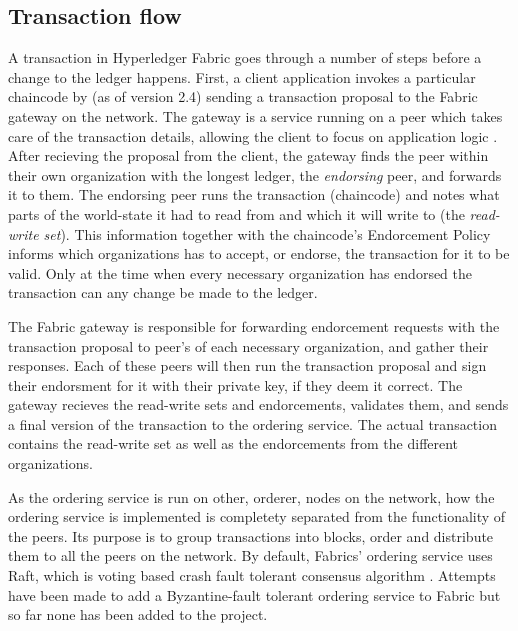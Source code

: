 \documentclass[english, biblatex, digitaloutput]{kththesis}
\begin{document}


\subsection{Transaction flow}
\label{subsec:transaction-flow}

A transaction in Hyperledger Fabric goes through a number of steps before a change to the ledger happens. First, a client application invokes a particular chaincode by (as of version 2.4) sending a transaction proposal to the Fabric gateway on the network. The gateway is a service running on a peer which takes care of the transaction details, allowing the client to focus on application logic \cite{fabric_gateway_2022}. After recieving the proposal from the client, the gateway finds the peer within their own organization with the longest ledger, the \textit{endorsing} peer, and forwards it to them. The endorsing peer runs the transaction (\ie chaincode) and notes what parts of the world-state it had to read from and which it will write to (the \textit{read-write set}). This information together with the chaincode's Endorcement Policy informs which organizations has to accept, or endorse, the transaction for it to be valid. Only at the time when every necessary organization has endorsed the transaction can any change be made to the ledger.

The Fabric gateway is responsible for forwarding endorcement requests with the transaction proposal to peer's of each necessary organization, and gather their responses. Each of these peers will then run the transaction proposal and sign their endorsment for it with their private key, if they deem it correct. The  gateway recieves the read-write sets and endorcements, validates them, and sends a final version of the transaction to the ordering service. The actual transaction contains the read-write set as well as the endorcements from the different organizations.

As the ordering service is run on other, orderer, nodes on the network, how the ordering service is implemented is completety separated from the functionality of the peers. Its purpose is to group transactions into blocks, order and distribute them to all the peers on the network. By default, Fabrics' ordering service uses Raft, which is voting based crash fault tolerant consensus algorithm \cite{ongaro_raft_2014}. Attempts have been made to add a Byzantine-fault tolerant ordering service to Fabric \cite{barger_byzantine_2021} but so far none has been added to the project.
\end{document}
